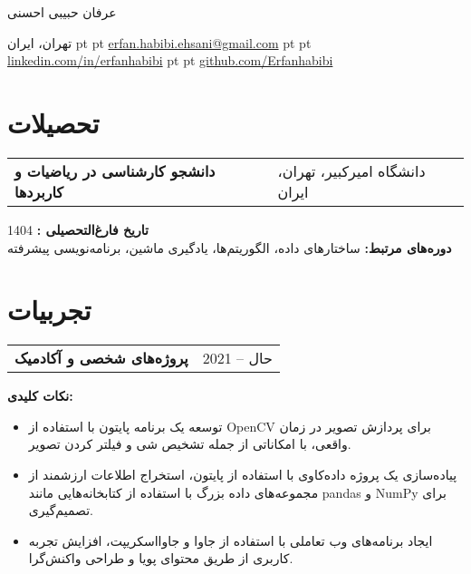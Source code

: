 \documentclass[10pt, a4paper]{article}
\newenvironment{header}{
    \centering
}{\par}
\begin{document}
    \begin{header}
        \fontsize{25 pt}{25 pt}\selectfont عرفان حبیبی احسنی

        \vspace{5 pt}

        \normalsize
        تهران، ایران%
         pt%
        \textbar%
         pt%
        \href{mailto:erfan.habibi.ehsani@gmail.com}{erfan.habibi.ehsani@gmail.com}%
         pt%
        \textbar%
         pt%
        \href{https://www.linkedin.com/in/erfanhabibi/}{linkedin.com/in/erfanhabibi}%
         pt%
        \textbar%
         pt%
        \href{https://github.com/Erfanhabibi}{github.com/Erfanhabibi}%
    \end{header}

\vspace{10 pt}

\section{تحصیلات}

\begin{tabularx}{\textwidth}{Xl} %
    \textbf{دانشجو کارشناسی در ریاضیات و کاربردها} & دانشگاه امیرکبیر، تهران، ایران \\
\end{tabularx}

\vspace{0.1 cm}

\textbf{تاریخ فارغ‌التحصیلی :} 1404\\

\textbf{دوره‌های مرتبط:} ساختارهای داده، الگوریتم‌ها، یادگیری ماشین، برنامه‌نویسی پیشرفته

\section{تجربیات}

\begin{tabularx}{\textwidth}{Xl} %
    \textbf{پروژه‌های شخصی و آکادمیک} & 2021 -- حال \\ 
\end{tabularx}

\vspace{0.1 cm}

\textbf{نکات کلیدی:}
\begin{itemize}
    \item توسعه یک برنامه پایتون با استفاده از OpenCV برای پردازش تصویر در زمان واقعی، با امکاناتی از جمله تشخیص شی و فیلتر کردن تصویر.
    \item پیاده‌سازی یک پروژه داده‌کاوی با استفاده از پایتون، استخراج اطلاعات ارزشمند از مجموعه‌های داده بزرگ با استفاده از کتابخانه‌هایی مانند pandas و NumPy برای تصمیم‌گیری.
    \item ایجاد برنامه‌های وب تعاملی با استفاده از جاوا و جاوااسکریپت، افزایش تجربه کاربری از طریق محتوای پویا و طراحی واکنش‌گرا.
\end{itemize}
\end{document}
